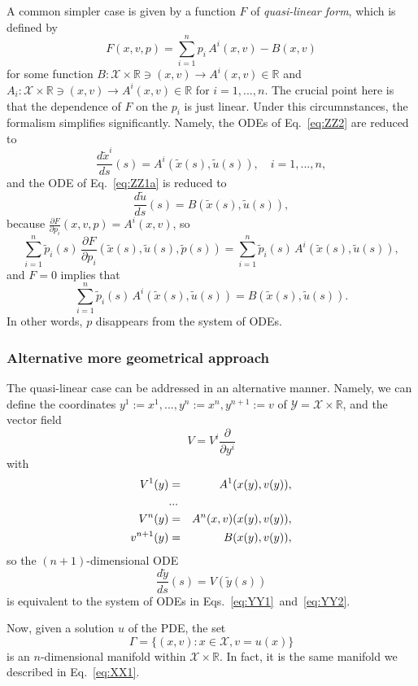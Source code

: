 \documentclass[11pt,spanish]{article}
\newcommand{\RR}{\mathbb{R}}
\begin{document}
A common simpler case is given by a function $F$ of {\em quasi-linear form}, which is defined by
$$
F(x,v,p)
=
\sum_{i=1}^n
p_i\,A^i(x,v)
-
B(x,v)
$$
for some function $B:\mathcal X\times \RR\ni (x,v) \to A^i(x,v)\in \RR$ and $A_i:\mathcal X\times \RR\ni (x,v) \to A^i(x,v)\in \RR$ for $i=1,...,n$.
The crucial point here is that the dependence of $F$ on the $p_i$ is just linear.
Under this circumnstances, the formalism simplifies significantly.
Namely, the ODEs of Eq.~\ref{eq:ZZ2} are reduced to
\begin{equation}
\label{eq:YY1}
\frac{d\tilde x^i}{ds}(s)
=
A^i(\tilde x(s),\tilde u(s)),
\quad
i=1,...,n,
\end{equation}
and the ODE of Eq.~\ref{eq:ZZ1a} is reduced to
\begin{equation}
\label{eq:YY2}
\frac{d \tilde u}{ds}(s)
=
B(\tilde x(s),\tilde u(s)),
\end{equation}
because $\frac{\partial F}{\partial p_i}(x,v,p)=A^i(x,v)$, so
$$
\sum_{i=1}^n
\tilde{p}_i(s)
\,
\frac{\partial F}{\partial p_i}(\tilde x(s),\tilde u(s),\tilde p(s))
=
\sum_{i=1}^n
\tilde{p}_i(s)
\,
A^i(\tilde x(s),\tilde u(s)),
$$
and $F=0$ implies that
$$
\sum_{i=1}^n
\tilde{p}_i(s)
\,
A^i(\tilde x(s),\tilde u(s))
=
B(\tilde x(s),\tilde u(s)).
$$
In other words, $p$ disappears from the system of ODEs.

\subsubsection{Alternative more geometrical approach}

The quasi-linear case can be addressed in an alternative manner.
Namely, we can define the coordinates $y^1:=x^1,...,y^n:=x^n,y^{n+1}:=v$ of $\mathcal Y = \mathcal X\times \RR$, and the vector field
$$
V=V^i\frac{\partial}{\partial y^i} 
$$
with
\begin{eqnarray}
V^1(y)&=&A^1(x(y),v(y)),\notag \\
&...&\notag \\
V^n(y)&=&A^n(x,v)(x(y),v(y)),\notag \\
v^{n+1}(y)&=&B(x(y),v(y)),\notag
\end{eqnarray}
so the $(n+1)$-dimensional ODE
$$
\frac{d\tilde y}{ds}(s)
=
V(\tilde y(s))
$$
is equivalent to the system of ODEs in Eqs.~\ref{eq:YY1}~and~\ref{eq:YY2}.

Now, given a solution $u$ of the PDE, the set
$$
\Gamma = \{(x,v):x\in \mathcal X,v=u(x)\}
$$
is an $n$-dimensional manifold within $\mathcal X\times \RR$.
In fact, it is the same manifold we described in Eq.~\ref{eq:XX1}.
\end{document}
